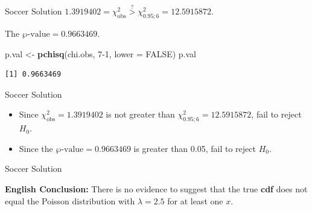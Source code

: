 \documentclass[
  ignorenonframetext,
]{beamer}
\newenvironment{Shaded}{\begin{snugshade}}{\end{snugshade}}
\newcommand{\AttributeTok}[1]{\textcolor[rgb]{0.13,0.29,0.53}{#1}}
\newcommand{\ConstantTok}[1]{\textcolor[rgb]{0.56,0.35,0.01}{#1}}
\newcommand{\DecValTok}[1]{\textcolor[rgb]{0.00,0.00,0.81}{#1}}
\newcommand{\FunctionTok}[1]{\textcolor[rgb]{0.13,0.29,0.53}{\textbf{#1}}}
\newcommand{\NormalTok}[1]{#1}
\newcommand{\OtherTok}[1]{\textcolor[rgb]{0.56,0.35,0.01}{#1}}
\begin{document}
\begin{frame}[fragile]{Soccer Solution}
\label{soccer-solution-7}
\(1.3919402=\chi^2_{\text{obs}}\overset{?}{>}\chi^2_{0.95;6}=12.5915872\).

The \(\wp\text{-value}= 0.9663469\).

\begin{Shaded}
\begin{Highlighting}[]
\NormalTok{p.val }\OtherTok{\textless{}{-}} \FunctionTok{pchisq}\NormalTok{(chi.obs, }\DecValTok{7{-}1}\NormalTok{, }\AttributeTok{lower =} \ConstantTok{FALSE}\NormalTok{)}
\NormalTok{p.val}
\end{Highlighting}
\end{Shaded}

\begin{verbatim}
[1] 0.9663469
\end{verbatim}
\end{frame}

\begin{frame}{Soccer Solution}
\label{soccer-solution-8}
\begin{itemize}
\item
  Since \(\chi^2_{\text{obs}}= 1.3919402\) is not greater than
  \(\chi^2_{0.95;6}=12.5915872\), fail to reject \(H_0\).
\item
  Since the \(\wp\text{-value}= 0.9663469\) is greater than 0.05, fail
  to reject \(H_0\).
\end{itemize}
\end{frame}

\begin{frame}{Soccer Solution}
\label{soccer-solution-9}
\begin{tcolorbox}
\textbf{English Conclusion:} There is no evidence to suggest that the true \textbf{cdf} does not equal the Poisson 
distribution with $\lambda=2.5$ for at least one $x$.
\end{tcolorbox}
\end{frame}
\end{document}

